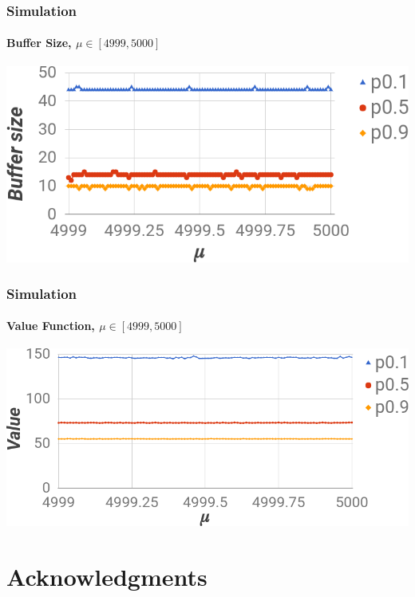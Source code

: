 \documentclass{beamer}
\begin{document}
\begin{frame}
 \frametitle{Simulation}
 \framesubtitle{Buffer Size, $\mu \in [4999,5000]$}  
 \begin{center}
    \includegraphics[width=1.0\textwidth]{pictures/bsim4999-5000.png}
  \end{center}
\end{frame}

\begin{frame}
  \frametitle{Simulation}
  \framesubtitle{Value Function, $\mu \in [4999,5000]$}
  \begin{center}
    \includegraphics[width=1.0\textwidth]{pictures/vsim4999-5000.png}
  \end{center}
\end{frame}




\section{Acknowledgments}
\end{document}
